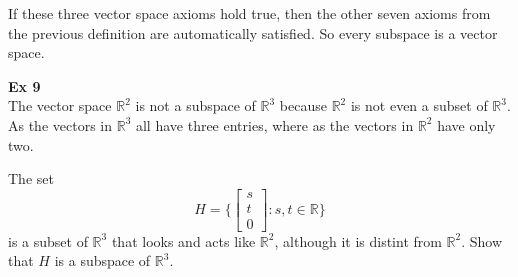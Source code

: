 \documentclass{article}
\begin{document}
    If these three vector space axioms hold true, then the other seven axioms from the previous definition are automatically satisfied. So every subspace is a vector space.

    \textbf{Ex 9}\\
    The vector space $ \mathbb{R}^{2} $ is not a subspace of $ \mathbb{R}^{3} $ because $ \mathbb{R}^{2} $ is not even a subset of $ \mathbb{R}^{3} $. As the vectors in $ \mathbb{R}^{3} $ all have three entries, where as the vectors in $ \mathbb{R}^{2} $ have only two.

    The set
    \[
      H=\{ \begin{bmatrix}
          s\\
          t\\
          0
      \end{bmatrix}: s,t \in \mathbb{R} \}
    \]
    is a subset of $ \mathbb{R}^{3} $ that looks and acts like $ \mathbb{R}^{2} $, although it is distint from $ \mathbb{R}^{2}  $. Show that $ H $ is a subspace of $ \mathbb{R}^{3} $. 
    
\end{document}
